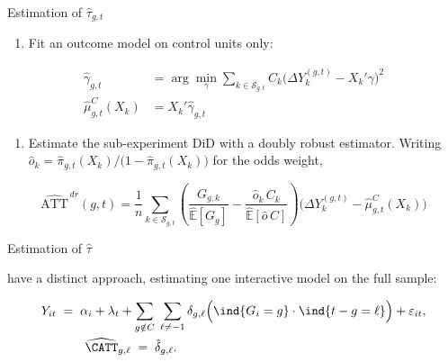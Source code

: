 \documentclass[11pt]{beamer}
\begin{document}
\begin{frame}{Estimation of $\hat{\tau}_{g,t}$}
    \begin{enumerate}
        \item[3.] Fit an outcome model on control units only:
    \end{enumerate}

    \vspace{-2mm}
    {\small
    \begin{align*}
      \hat\gamma_{g,t}
        &= \arg\min_{\gamma} \sum_{k \in \mathcal{S}_{g,t}}
           C_k \Big( \Delta Y_k^{(g,t)} - X_k'\gamma \Big)^{2} \\[1mm]
      \hat\mu^{C}_{g,t}(X_k) &= X_k'\hat\gamma_{g,t}
    \end{align*}
    }

    \vspace{1mm}
    \begin{enumerate}
        \item[4.] Estimate the sub-experiment DiD with a doubly robust estimator.
              Writing $\hat o_k = \hat\pi_{g,t}(X_k) / \big(1 - \hat\pi_{g,t}(X_k)\big)$
              for the odds weight,
    \end{enumerate}

    \vspace{-2mm}
    {\small
    \begin{equation*}
      \widehat{\text{ATT}}^{\,dr}(g,t)
      = \frac{1}{n} \sum_{k \in \mathcal{S}_{g,t}}
        \left( \frac{G_{g,k}}{\widehat{\mathbb{E}}[G_g]}
             - \frac{\hat o_k \, C_k}{\widehat{\mathbb{E}}[\hat o \, C]} \right)
        \Big( \Delta Y_k^{(g,t)} - \hat\mu^{C}_{g,t}(X_k) \Big)
    \end{equation*}
    }

    \vfill
    \hfill\hyperlink{selecting}{}
    \hyperlink{appendix}{}
\end{frame}

\begin{frame}[label=est_sa]{Estimation of $\hat{\tau}$}

\cite{sun2021estimating} have a distinct approach, estimating one interactive model on the full sample:

\begin{align*}
  Y_{it}
  \;&=\;
  \alpha_i + \lambda_t
  + \sum_{g \notin C} \; \sum_{\ell \neq -1}
    \delta_{g,\ell} \Big( \ind{G_i = g} \cdot \ind{t - g = \ell} \Big)
  + \varepsilon_{it}, \\
  &\qquad
  \widehat{\CATT}_{g,\ell} \;=\; \hat\delta_{g,\ell}.
\end{align*}

    \vfill
    \hfill\hyperlink{selecting}{}
    \hyperlink{appendix}{}
\end{frame}
\end{document}
